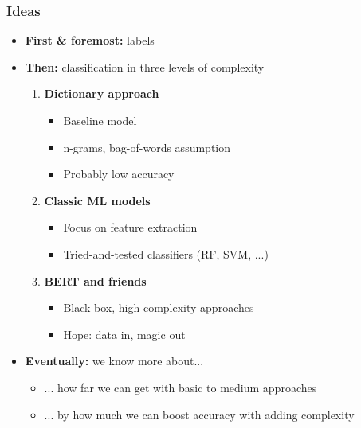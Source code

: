 \documentclass[t]{beamer}
\newcommand{\highlight}[1]{\colorbox{gray!20}{#1}}
\begin{document}
\begin{frame}
\frametitle{Ideas}

\begin{itemize}
  \item \textbf{First \& foremost:} \highlight{labels}
  \item \textbf{Then:} \highlight{classification} in three levels of complexity
  \begin{enumerate}
    \footnotesize
    \item \textbf{Dictionary approach}
    \begin{itemize}
      \item Baseline model
      \item n-grams, bag-of-words assumption
      \item Probably low accuracy
    \end{itemize}
    \item \textbf{Classic ML models} 
    \begin{itemize}
      \item Focus on feature extraction
      \item Tried-and-tested classifiers (RF, SVM, ...)
    \end{itemize}
    \item \textbf{BERT and friends} 
    \begin{itemize}
      \item Black-box, high-complexity approaches
      \item Hope: data in, magic out
    \end{itemize}
  \end{enumerate}
  \item \textbf{Eventually:} we know more about...
  \begin{itemize}
    \footnotesize
    \item ... how far we can get with basic to medium approaches
    \item ... by how much we can boost accuracy with adding complexity
  \end{itemize}
\end{itemize}

\end{frame}

\end{document}
